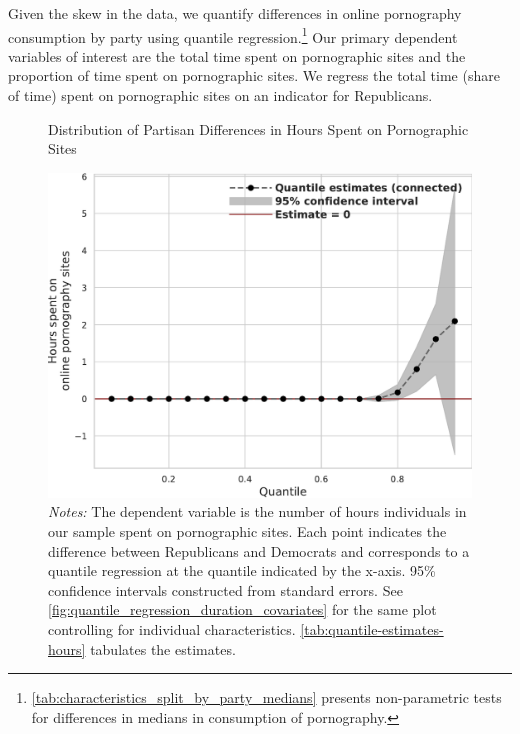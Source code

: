 \documentclass[12pt, letterpaper]{article}
\begin{document}
Given the skew in the data, we quantify differences in online pornography consumption by party using quantile regression.\footnote{\cref{tab:characteristics_split_by_party_medians} presents non-parametric tests for differences in medians in consumption of pornography.} Our primary dependent variables of interest are the total time spent on pornographic sites and the proportion of time spent on pornographic sites. We regress the total time (share of time) spent on pornographic sites on an indicator for Republicans. 

\begin{figure}[t]
	\centering
	\caption{Distribution of Partisan Differences in Hours Spent on Pornographic Sites}
	\includegraphics[width=.7\linewidth]{figs/quantile_reg_duration_adult.pdf}
	\caption*{\footnotesize \emph{Notes:} 
		The dependent variable is the number of hours individuals in our sample spent on pornographic sites.
		Each point indicates the difference between Republicans and Democrats and corresponds to a quantile regression at the quantile indicated by the x-axis.
		95\% confidence intervals constructed from standard errors.
		See \cref{fig:quantile_regression_duration_covariates} for the same plot controlling for individual characteristics.
        \cref{tab:quantile-estimates-hours} tabulates the estimates.
	}
	\label{fig:quantile_regression_duration}
\end{figure}
\end{document}

